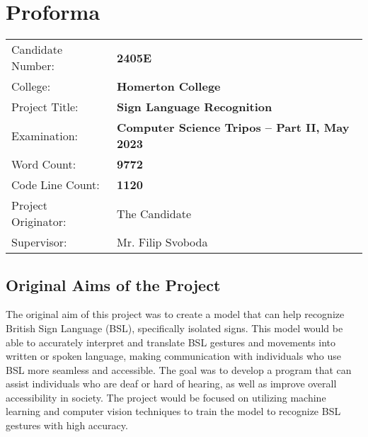\documentclass[final,rdr32.tex]{subfiles}
\begin{document}
\pagestyle{plain}

\chapter*{Proforma}

 {\large
  \begin{tabular}{ll}
      Candidate Number:   & \bf 2405E                                        \\
      College:            & \bf Homerton College                             \\
      Project Title:      & \bf Sign Language Recognition                    \\
      Examination:        & \bf Computer Science Tripos -- Part II, May 2023 \\
      Word Count:         & \bf 9772\footnotemark[1]                         \\
      Code Line Count:    & \bf 1120\footnotemark[2]                         \\
      Project Originator: & The Candidate                                    \\
      Supervisor:         & Mr. Filip Svoboda                                \\
  \end{tabular}
 }


\section*{Original Aims of the Project}


The original aim of this project was to create a model that can help recognize British Sign Language (BSL), specifically isolated signs. This model would be able to accurately interpret and translate BSL gestures and movements into written or spoken language, making communication with individuals who use BSL more seamless and accessible. The goal was to develop a program that can assist individuals who are deaf or hard of hearing, as well as improve overall accessibility in society. The project would be focused on utilizing machine learning and computer vision techniques to train the model to recognize BSL gestures with high accuracy.
\end{document}
